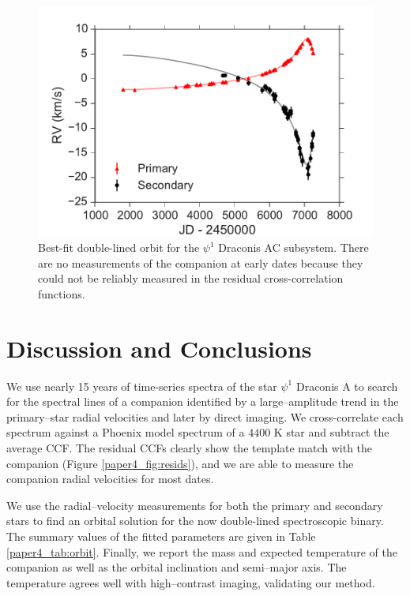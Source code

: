 \begin{figure}

  \includegraphics[width=\columnwidth]{Figures/paper4_SB2_Orbit.pdf}
  \caption{Best-fit double-lined orbit for the $\psi^1$ Draconis AC subsystem. There are no measurements of the companion at early dates because they could not be reliably measured in the residual cross-correlation functions.}
  \label{paper4_fig:orbit}
  
\end{figure}



\section{Discussion and Conclusions}

We use nearly 15 years of time-series spectra of the star $\psi^1$ Draconis A to search for the spectral lines of a companion identified by a large--amplitude trend in the primary--star radial velocities and later by direct imaging. We cross-correlate each spectrum against a Phoenix model spectrum of a $4400$ K star and subtract the average CCF. The residual CCFs clearly show the template match with the companion (Figure \ref{paper4_fig:resids}), and we are able to measure the companion radial velocities for most dates. 

We use the radial--velocity measurements for both the primary and secondary stars to find an orbital solution for the now double-lined spectroscopic binary. The summary values of the fitted parameters are given in Table \ref{paper4_tab:orbit}. Finally, we report the mass and expected temperature of the companion as well as the orbital inclination and semi--major axis. The temperature agrees well with high--contrast imaging, validating our method.

